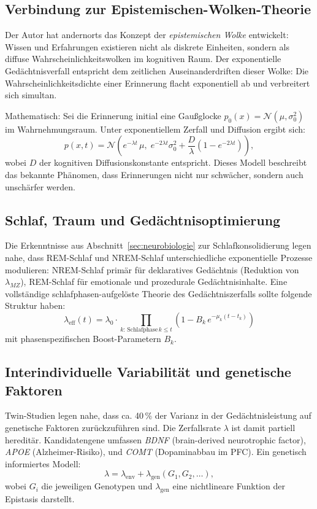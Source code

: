 ﻿\documentclass[12pt,a4paper,twoside]{article}
\theoremstyle{theormstyle}
\theoremstyle{proofstyle}
\begin{document}
	\subsection{Verbindung zur Epistemischen-Wolken-Theorie}
	
	Der Autor hat andernorts \citep{epp2026subgraph} das Konzept der
	\emph{epistemischen Wolke} entwickelt: Wissen und Erfahrungen existieren
	nicht als diskrete Einheiten, sondern als diffuse Wahrscheinlichkeitswolken
	im kognitiven Raum. Der exponentielle Gedächtnisverfall entspricht
	dem zeitlichen Auseinanderdriften dieser Wolke: Die Wahrscheinlichkeitsdichte
	einer Erinnerung flacht exponentiell ab und verbreitert sich simultan.
	
	Mathematisch: Sei die Erinnerung initial eine Gaußglocke
	$p_0(x) = \mathcal{N}(\mu, \sigma_0^2)$ im Wahrnehmungsraum.
	Unter exponentiellem Zerfall und Diffusion ergibt sich:
	\[
	p(x, t) = \mathcal{N}\!\left(e^{-\lambda t}\,\mu,\;
	e^{-2\lambda t}\sigma_0^2 + \frac{D}{\lambda}(1-e^{-2\lambda t})\right),
	\]
	wobei $D$ der kognitiven Diffusionskonstante entspricht.
	Dieses Modell beschreibt das bekannte Phänomen, dass Erinnerungen
	nicht nur schwächer, sondern auch unschärfer werden.
	
	\subsection{Schlaf, Traum und Gedächtnisoptimierung}
	
	Die Erkenntnisse aus Abschnitt~\ref{sec:neurobiologie} zur
	Schlafkonsolidierung legen nahe, dass REM-Schlaf und NREM-Schlaf
	unterschiedliche exponentielle Prozesse modulieren:
	NREM-Schlaf primär für deklaratives Gedächtnis (Reduktion von $\lambda_{MZ}$),
	REM-Schlaf für emotionale und prozedurale Gedächtnisinhalte.
	Eine vollständige schlafphasen-aufgelöste Theorie des Gedächtniszerfalls
	sollte folgende Struktur haben:
	\[
	\lambda_{\mathrm{eff}}(t)
	= \lambda_0 \cdot \prod_{k:\,\text{Schlafphase}\,k\leq t}
	(1 - B_k\,e^{-\mu_k(t-t_k)})
	\]
	mit phasenspezifischen Boost-Parametern $B_k$.
	
	\subsection{Interindividuelle Variabilität und genetische Faktoren}
	
	Twin-Studien legen nahe, dass ca. 40\,\% der Varianz in der
	Gedächtnisleistung auf genetische Faktoren zurückzuführen sind.
	Die Zerfallsrate $\lambda$ ist damit partiell hereditär.
	Kandidatengene umfassen \textit{BDNF} (brain-derived neurotrophic factor),
	\textit{APOE} (Alzheimer-Risiko), und \textit{COMT} (Dopaminabbau im PFC).
	Ein genetisch informiertes Modell:
	\[
	\lambda = \lambda_{\mathrm{env}} + \lambda_{\mathrm{gen}}(G_1, G_2, \ldots),
	\]
	wobei $G_i$ die jeweiligen Genotypen und $\lambda_{\mathrm{gen}}$
	eine nichtlineare Funktion der Epistasis darstellt.
	
\end{document}
